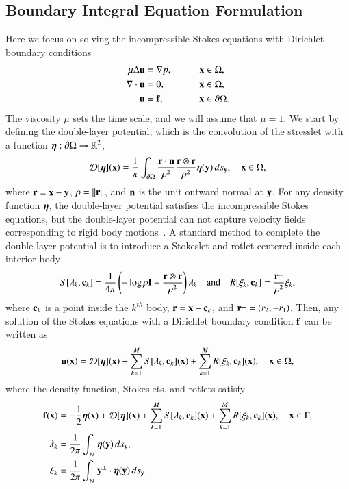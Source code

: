 \documentclass[preprint, 10pt]{elsarticle}
\begin{document}
\subsection{Boundary Integral Equation Formulation} 
\label{sec:bies}
Here we focus on solving the incompressible Stokes equations with
Dirichlet boundary conditions
\begin{alignat*}{3}
  \mu\Delta {\mathbf{u}} &= {\nabla} p, \qquad && {\mathbf{x}} \in \Omega, \\
  {\nabla} \cdot {\mathbf{u}} &= 0,   && {\mathbf{x}} \in \Omega, \\
  {\mathbf{u}} &= {\mathbf{f}},  && {\mathbf{x}} \in {\partial}\Omega.
\end{alignat*}
The viscosity $\mu$ sets the time scale, and we will assume that
$\mu=1$.  We start by defining the double-layer potential, which is the
convolution of the stresslet with a function ${\boldsymbol\eta}:{\partial}\Omega
\rightarrow {\mathbb{R}}^2$,
\begin{align}
  {\mathcal{D}}[{\boldsymbol\eta}]({\mathbf{x}}) = \frac{1}{\pi} \int_{{\partial}\Omega} 
    \frac{{\mathbf{r}} \cdot {\mathbf{n}}}{\rho^2} \frac{{\mathbf{r}} \otimes {\mathbf{r}}}{\rho^2} 
    {\boldsymbol\eta}({\mathbf{y}}) \, ds_{\mathbf{y}}, \quad {\mathbf{x}} \in \Omega,
    \label{eqn:velocityDLP}
\end{align}
where ${\mathbf{r}} = {\mathbf{x}} - {\mathbf{y}}$, $\rho = \|{\mathbf{r}}\|$, and ${\mathbf{n}}$ is the unit outward
normal at ${\mathbf{y}}$.  For any density function ${\boldsymbol\eta}$, the double-layer
potential satisfies the incompressible Stokes equations, but the
double-layer potential can not capture velocity fields corresponding to
rigid body motions~\cite{pow-mir1987}.  A standard method to complete
the double-layer potential is to introduce a Stokeslet and rotlet
centered inside each interior body
\begin{align}
  S[{\boldsymbol\lambda}_k,{\mathbf{c}}_k] = \frac{1}{4\pi} \left(-\log \rho {\mathbf{I}} + 
    \frac{{\mathbf{r}} \otimes {\mathbf{r}}}{\rho^2} \right){\boldsymbol\lambda}_k
  \quad \text{and} \quad
  R[\xi_k,{\mathbf{c}}_k] = \frac{{\mathbf{r}}^\perp}{\rho^2}\xi_k,
  \label{eqn:stokeslet_rotlet}
\end{align}
where ${\mathbf{c}}_k$ is a point inside the $k^{th}$ body,  ${\mathbf{r}} = {\mathbf{x}} - {\mathbf{c}}_k$,
and ${\mathbf{r}}^\perp = (r_2,-r_1)$.  Then, any solution of the Stokes
equations with a Dirichlet boundary condition ${\mathbf{f}}$ can be written as
\begin{align}
  \label{eqn:completed_DLP}
  {\mathbf{u}}({\mathbf{x}}) = {\mathcal{D}}[{\boldsymbol\eta}]({\mathbf{x}}) + \sum_{k=1}^{M} S[{\boldsymbol\lambda}_k,{\mathbf{c}}_k]({\mathbf{x}}) +
              \sum_{k=1}^{M} R[\xi_k,{\mathbf{c}}_k]({\mathbf{x}}), \quad {\mathbf{x}} \in \Omega,
\end{align}
where the density function, Stokeslets, and rotlets satisfy
\begin{subequations}
\label{eqn:completed_BIE}
\begin{align}
  {\mathbf{f}}({\mathbf{x}}) &= -\frac{1}{2}{\boldsymbol\eta}({\mathbf{x}}) + {\mathcal{D}}[{\boldsymbol\eta}]({\mathbf{x}}) + 
      \sum_{k=1}^{M} S[{\boldsymbol\lambda}_k,{\mathbf{c}}_k]({\mathbf{x}}) +
      \sum_{k=1}^{M} R[\xi_k,{\mathbf{c}}_k]({\mathbf{x}}), \quad {\mathbf{x}} \in \Gamma, 
      \label{eqn:DLP}\\
  {\boldsymbol\lambda}_k &= \frac{1}{2\pi}\int_{\gamma_k} {\boldsymbol\eta}({\mathbf{y}}) \, ds_{\mathbf{y}}, 
  \label{eqn:stokeslet} \\
  \xi_k &= \frac{1}{2\pi}\int_{\gamma_k} {\mathbf{y}}^\perp \cdot {\boldsymbol\eta}({\mathbf{y}})
  \, ds_{\mathbf{y}}.
  \label{eqn:rotlet}
\end{align}
\end{subequations}
\end{document}
